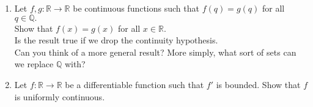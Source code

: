 \documentclass{article}
\begin{document}
\begin{enumerate}
	\item Let $f, g: \mathbb{R} \to \mathbb{R}$ be continuous functions such that $f(q) = g(q)$ for all $q \in \mathbb{Q}.$\\
	Show that $f(x) = g(x)$ for all $x \in \mathbb{R}.$\\
	Is the result true if we drop the continuity hypothesis.\\
	Can you think of a more general result? More simply, what sort of sets can we replace $\mathbb{Q}$ with?
	\item Let $f:\mathbb{R} \to \mathbb{R}$ be a differentiable function such that $f'$ is bounded. Show that $f$ is uniformly continuous.
\end{enumerate}
\end{document}
